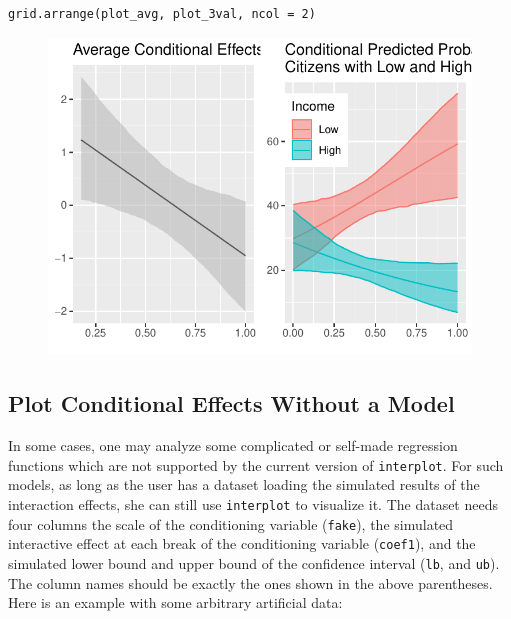 \documentclass[
  article]{jss}
\begin{document}
\begin{verbatim}
grid.arrange(plot_avg, plot_3val, ncol = 2)
\end{verbatim}

\begin{figure}[H]

{\centering \includegraphics{jss_manuscript_files/figure-pdf/unnamed-chunk-18-1.pdf}

}

\end{figure}

\hypertarget{plot-conditional-effects-without-a-model}{%
\subsection{Plot Conditional Effects Without a
Model}\label{plot-conditional-effects-without-a-model}}

In some cases, one may analyze some complicated or self-made regression
functions which are not supported by the current version of
\texttt{interplot}. For such models, as long as the user has a dataset
loading the simulated results of the interaction effects, she can still
use \texttt{interplot} to visualize it. The dataset needs four columns
the scale of the conditioning variable (\texttt{fake}), the simulated
interactive effect at each break of the conditioning variable
(\texttt{coef1}), and the simulated lower bound and upper bound of the
confidence interval (\texttt{lb}, and \texttt{ub}). The column names
should be exactly the ones shown in the above parentheses. Here is an
example with some arbitrary artificial data:
\end{document}
